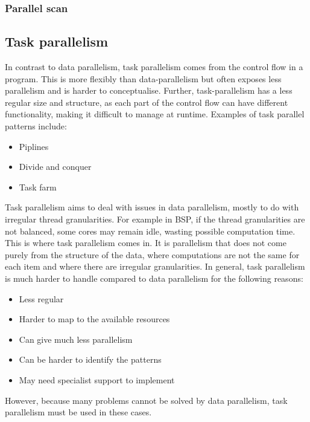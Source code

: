 \documentclass[CS4204-Notes.tex]{subfiles}
\begin{document}
\subsubsection{Parallel scan}

\subsection{Task parallelism}
In contrast to data parallelism, task parallelism comes from the control flow in a program. This is more flexibly than data-parallelism but often exposes less parallelism and is harder to conceptualise. Further, task-parallelism has a less regular size and structure, as each part of the control flow can have different functionality, making it difficult to manage at runtime. 
\n
Examples of task parallel patterns include:
\begin{itemize}
\item Piplines
\item Divide and conquer
\item Task farm
\end{itemize}
Task parallelism aims to deal with issues in data parallelism, mostly to do with irregular thread granularities. For example in BSP, if the thread granularities are not balanced, some cores may remain idle, wasting possible computation time. This is where task parallelism comes in. It is parallelism that does not come purely from the structure of the data, where computations are not the same for each item and where there are irregular granularities.
\n
In general, task parallelism is much harder to handle compared to data parallelism for the following reasons:
\begin{itemize}
\item Less regular
\item Harder to map to the available resources
\item Can give much less parallelism
\item Can be harder to identify the patterns
\item May need specialist support to implement
\end{itemize}
However, because many problems cannot be solved by data parallelism, task parallelism must be used in these cases.
\end{document}
